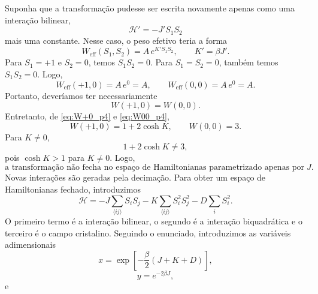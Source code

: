 \documentclass[12pt,a4paper]{article}
\begin{document}
%
Suponha que a transformação pudesse ser escrita novamente apenas como
uma interação bilinear,
%
\begin{equation}
    \mathcal H'
    =
    -J'S_1S_2
\end{equation}
%
mais uma constante. Nesse caso, o peso efetivo teria a forma
%
\begin{equation}
    W_{\mathrm{eff}}(S_1,S_2)
    =
    A\,e^{K' S_1S_2},
    \qquad
    K'=\beta J'.
\end{equation}
%
Para \(S_1=+1\) e \(S_2=0\), temos \(S_1S_2=0\). Para \(S_1=S_2=0\),
também temos \(S_1S_2=0\). Logo,
%
\begin{equation}
    W_{\mathrm{eff}}(+1,0)
    =
    A\,e^{0}
    =
    A,
    \qquad
    W_{\mathrm{eff}}(0,0)
    =
    A\,e^{0}
    =
    A.
\end{equation}
%
Portanto, deveríamos ter necessariamente
%
\begin{equation}
    W(+1,0)=W(0,0).
\end{equation}
%
Entretanto, de \eqref{eq:W+0_p4} e \eqref{eq:W00_p4},
%
\begin{equation}
    W(+1,0)=1+2\cosh K,
    \qquad
    W(0,0)=3.
\end{equation}
%
Para \(K\neq0\),
%
\begin{equation}
    1+2\cosh K
    \neq
    3,
\end{equation}
%
pois \(\cosh K>1\) para \(K\neq0\). Logo,
%
\begin{equation}
    \boxed{
    \text{a transformação não fecha no espaço de Hamiltonianas
    parametrizado apenas por }J.
    }
\end{equation}
%
Novas interações são geradas pela decimação. Para obter um espaço de Hamiltonianas fechado, introduzimos
%
\begin{equation}
    \mathcal H
    =
    -J\sum_{\langle ij\rangle}S_iS_j
    -K\sum_{\langle ij\rangle}S_i^2S_j^2
    -D\sum_iS_i^2.    \label{eq:H_spin1_extended}
\end{equation}
%
O primeiro termo é a interação bilinear, o segundo é a interação
biquadrática e o terceiro é o campo cristalino. Seguindo o enunciado, introduzimos as variáveis adimensionais
%
\begin{equation}
    x=
    \exp\left[
        -\frac{\beta}{2}(J+K+D)
    \right],
    \label{eq:x_spin1}
\end{equation}
%
\begin{equation}
    y=e^{-2\beta J},
    \label{eq:y_spin1}
\end{equation}
%
e
\end{document}
